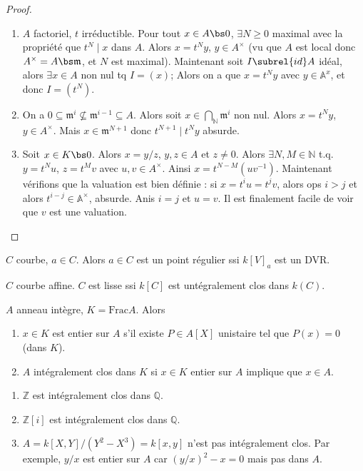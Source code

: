         \begin{proof}
            \begin{enumerate}
                \item $A$ factoriel, $t$ irréductible. Pour tout $x \in A \bs 0$, $\exists N \geq 0$ maximal avec la propriété que $t^N \mid x$ dans $A$. Alors $x = t^Ny$, $y \in A^\times$ (vu que $A$ est local donc $A^\times = A \bs \mathfrak{m}$, et $N$ est maximal). Maintenant soit $I \subrel{id} A$ idéal, alors $\exists x \in A$ non nul tq $I = (x)$; Alors on a que $x = t^Ny$ avec $y \in \mathbb{A}^x$, et donc $I = (t^N)$.
                \item On a $0 \subseteq \mathfrak{m}^i \nsubseteq \mathfrak{m}^{i-1} \subseteq A$. Alors soit $x \in \bigcap_{\mathbb{N}} \mathfrak{m}^i$ non nul. Alors $x = t^Ny$, $y \in A^\times$. Mais $x \in \mathfrak{m}^{N+1}$ donc $t^{N+1} \mid t^Ny$ absurde.
                \item Soit $x \in K \bs 0$. Alors $x = y/z$, $y,z \in A$ et $z \neq 0$. Alors $\exists N,M \in \mathbb{N}$ t.q. $y = t^Nu$, $z = t^Mv$ avec $u,v \in A^\times$. Ainsi $x = t^{N-M}(uv^{-1})$. Maintenant vérifions que la valuation est bien définie : si $x = t^iu = t^jv$, alors ops $i > j$ et alors $t^{i-j} \in \mathbb{A}^\times$, absurde. Anis $i = j$ et $u = v$. Il est finalement facile de voir que $v$ est une valuation.
            \end{enumerate}
        \end{proof}
        \begin{theo}
            $C$ courbe, $a \in C$. Alors $a \in C$ est un point régulier ssi $k[V]_a$ est un DVR.
        \end{theo}
        \begin{theo}
            $C$ courbe affine. $C$ est lisse ssi $k[C]$ est untégralement clos dans $k(C)$.
        \end{theo}
        \begin{defi}
            $A$ anneau intègre, $K = \mathrm{Frac} A$. Alors
            \begin{enumerate}
                \item $x \in K$ est entier sur $A$ s'il existe $P \in A[X]$ unistaire tel que $P(x) = 0$ (dans $K$).
                \item $A$ intégralement clos dans $K$ si $x \in K$ entier sur $A$ implique que $x \in A$.
            \end{enumerate}
        \end{defi}
        \begin{expl}
            \begin{enumerate}
                \item $\mathbb{Z}$ est intégralement clos dans $\mathbb{Q}$.
                \item $\mathbb{Z}[i]$ est intégralement clos dans $\mathbb{Q}$.
                \item $A = k[X,Y]/(Y^2 - X^3) = k[x,y]$ n'est pas intégralement clos. Par exemple, $y/x$ est entier sur $A$ car $(y/x)^2 - x = 0$ mais pas dans $A$.
            \end{enumerate}
        \end{expl}
